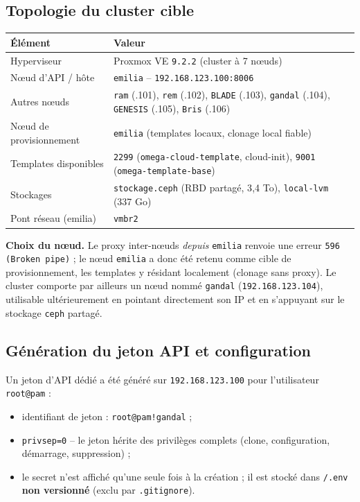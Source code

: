 \documentclass[11pt,a4paper]{article}
\newcommand{\code}[1]{\texttt{\small #1}}
\begin{document}
\subsection{Topologie du cluster cible}

\begin{tabularx}{\linewidth}{@{}l X@{}}
\toprule
\textbf{Élément} & \textbf{Valeur} \\
\midrule
Hyperviseur & Proxmox VE \code{9.2.2} (cluster à 7 nœuds) \\
Nœud d'API / hôte & \code{emilia} -- \code{192.168.123.100:8006} \\
Autres nœuds & \code{ram} (.101), \code{rem} (.102), \code{BLADE} (.103),
\code{gandal} (.104), \code{GENESIS} (.105), \code{Bris} (.106) \\
Nœud de provisionnement & \code{emilia} (templates locaux, clonage local fiable) \\
Templates disponibles & \code{2299} (\code{omega-cloud-template}, cloud-init),
\code{9001} (\code{omega-template-base}) \\
Stockages & \code{stockage.ceph} (RBD partagé, 3{,}4 To), \code{local-lvm} (337 Go) \\
Pont réseau (emilia) & \code{vmbr2} \\
\bottomrule
\end{tabularx}

\medskip
\noindent\textbf{Choix du nœud.} Le proxy inter-nœuds \emph{depuis} \code{emilia} renvoie
une erreur \code{596 (Broken pipe)} ; le nœud \code{emilia} a donc été retenu comme cible
de provisionnement, les templates y résidant localement (clonage sans proxy). Le cluster
comporte par ailleurs un nœud nommé \code{gandal} (\code{192.168.123.104}), utilisable
ultérieurement en pointant directement son IP et en s'appuyant sur le stockage \code{ceph}
partagé.

\subsection{Génération du jeton API et configuration}

Un jeton d'API dédié a été généré sur \code{192.168.123.100} pour l'utilisateur
\code{root@pam} :
\begin{itemize}
  \item identifiant de jeton : \code{root@pam!gandal} ;
  \item \code{privsep=0} -- le jeton hérite des privilèges complets (clone, configuration,
        démarrage, suppression) ;
  \item le secret n'est affiché qu'une seule fois à la création ; il est stocké dans
        \code{/.env} \textbf{non versionné} (exclu par \code{.gitignore}).
\end{itemize}
\end{document}

